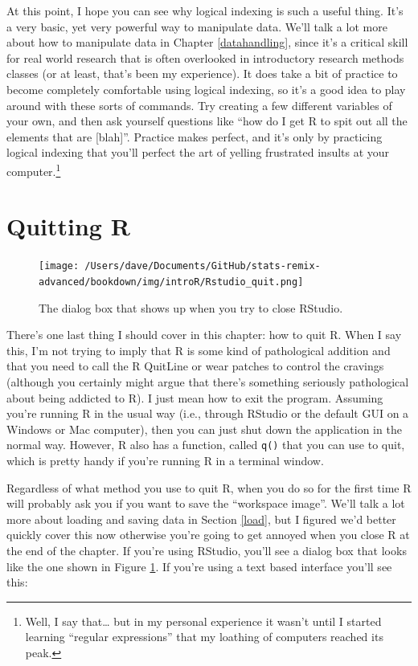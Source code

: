 \documentclass[
]{book}
\begin{document}
At this point, I hope you can see why logical indexing is such a useful thing. It's a very basic, yet very powerful way to manipulate data. We'll talk a lot more about how to manipulate data in Chapter \ref{datahandling}, since it's a critical skill for real world research that is often overlooked in introductory research methods classes (or at least, that's been my experience). It does take a bit of practice to become completely comfortable using logical indexing, so it's a good idea to play around with these sorts of commands. Try creating a few different variables of your own, and then ask yourself questions like ``how do I get R to spit out all the elements that are {[}blah{]}''. Practice makes perfect, and it's only by practicing logical indexing that you'll perfect the art of yelling frustrated insults at your computer.\footnote{Well, I say that\ldots{} but in my personal experience it wasn't until I started learning ``regular expressions'' that my loathing of computers reached its peak.}

\hypertarget{quitting-r}{%
\section{Quitting R}\label{quitting-r}}

\begin{figure}
\centering
\texttt{[image: /Users/dave/Documents/GitHub/stats-remix-advanced/bookdown/img/introR/Rstudio\_quit.png]}
\caption{\label{fig:quitR}The dialog box that shows up when you try to close RStudio.}
\end{figure}

There's one last thing I should cover in this chapter: how to quit R. When I say this, I'm not trying to imply that R is some kind of pathological addition and that you need to call the R QuitLine or wear patches to control the cravings (although you certainly might argue that there's something seriously pathological about being addicted to R). I just mean how to exit the program. Assuming you're running R in the usual way (i.e., through RStudio or the default GUI on a Windows or Mac computer), then you can just shut down the application in the normal way. However, R also has a function, called \texttt{q()} that you can use to quit, which is pretty handy if you're running R in a terminal window.

Regardless of what method you use to quit R, when you do so for the first time R will probably ask you if you want to save the ``workspace image''. We'll talk a lot more about loading and saving data in Section \ref{load}, but I figured we'd better quickly cover this now otherwise you're going to get annoyed when you close R at the end of the chapter. If you're using RStudio, you'll see a dialog box that looks like the one shown in Figure \ref{fig:quitR}. If you're using a text based interface you'll see this:
\end{document}
